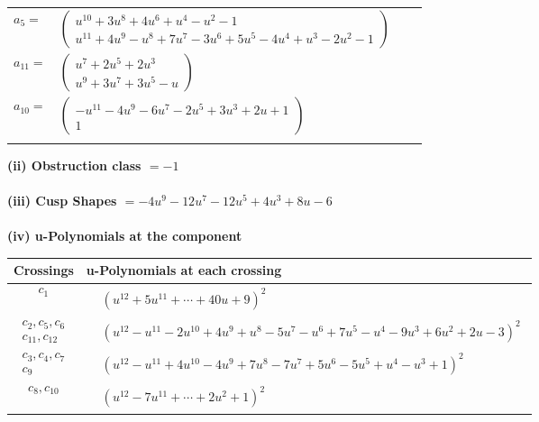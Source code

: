 \documentclass[1p]{elsarticle_modified}
\theoremstyle{definition}
\begin{document}
\begin{tabular}{m{7pt} m{180pt} m{7pt} m{180pt} }
\flushright $a_{5}=$&$\begin{pmatrix}u^{10}+3 u^8+4 u^6+u^4- u^2-1\\u^{11}+4 u^9- u^8+7 u^7-3 u^6+5 u^5-4 u^4+u^3-2 u^2-1\end{pmatrix}$ \\
\flushright $a_{11}=$&$\begin{pmatrix}u^7+2 u^5+2 u^3\\u^9+3 u^7+3 u^5- u\end{pmatrix}$ \\
\flushright $a_{10}=$&$\begin{pmatrix}- u^{11}-4 u^9-6 u^7-2 u^5+3 u^3+2 u+1\\1\end{pmatrix}$\\&\end{tabular}
\flushleft \textbf{(ii) Obstruction class $= -1$}\\~\\
\flushleft \textbf{(iii) Cusp Shapes $= -4 u^9-12 u^7-12 u^5+4 u^3+8 u-6$}\\~\\
\newpage\renewcommand{\arraystretch}{1}
\flushleft \textbf{(iv) u-Polynomials at the component}\newline \\
\begin{tabular}{m{50pt}|m{274pt}}
Crossings & \hspace{64pt}u-Polynomials at each crossing \\
\hline $$\begin{aligned}c_{1}\end{aligned}$$&$\begin{aligned}
&(u^{12}+5 u^{11}+\cdots+40 u+9)^{2}
\end{aligned}$\\
\hline $$\begin{aligned}c_{2},c_{5},c_{6}\\c_{11},c_{12}\end{aligned}$$&$\begin{aligned}
&(u^{12}- u^{11}-2 u^{10}+4 u^9+u^8-5 u^7- u^6+7 u^5- u^4-9 u^3+6 u^2+2 u-3)^{2}
\end{aligned}$\\
\hline $$\begin{aligned}c_{3},c_{4},c_{7}\\c_{9}\end{aligned}$$&$\begin{aligned}
&(u^{12}- u^{11}+4 u^{10}-4 u^9+7 u^8-7 u^7+5 u^6-5 u^5+u^4- u^3+1)^2
\end{aligned}$\\
\hline $$\begin{aligned}c_{8},c_{10}\end{aligned}$$&$\begin{aligned}
&(u^{12}-7 u^{11}+\cdots+2 u^2+1)^{2}
\end{aligned}$\\
\hline
\end{tabular}\\~\\
\end{document}
